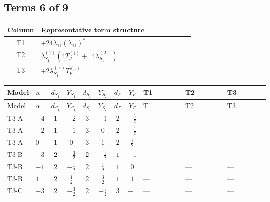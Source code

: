\documentclass[8pt]{article}
\begin{document}
\begin{landscape}
\subsection*{Terms 6 of 9}
\begin{center}
\begin{tabular}{@{}c >{\raggedright\arraybackslash}p{0.82\linewidth}@{}}
\toprule
Column & Representative term structure \\
\midrule
T1 & \(\displaystyle +24 {\lambda_{11}} \left({\lambda_{11}}\right)^{*}\) \\
\midrule
T2 & \(\displaystyle {\lambda_{S_1}^{(1)}} (4 T_{\nu}^{(1)}+14 {\lambda_{S_1}^{(A)}})\) \\
\midrule
T3 & \(\displaystyle +2 {\lambda_{S_1}^{(A)}} T_{\nu}^{(1)}\) \\
\midrule
\bottomrule
\end{tabular}
\end{center}
\smallskip
\tiny
\begin{longtable}{@{}llcccccc >{\raggedright\arraybackslash}p{0.21\linewidth} >{\raggedright\arraybackslash}p{0.21\linewidth} >{\raggedright\arraybackslash}p{0.21\linewidth}@{}}
\toprule
Model & $\alpha$ & $d_{S_1}$ & $Y_{S_1}$ & $d_{S_2}$ & $Y_{S_2}$ & $d_F$ & $Y_F$ & T1 & T2 & T3 \\
\midrule
\endfirsthead
\toprule
Model & $\alpha$ & $d_{S_1}$ & $Y_{S_1}$ & $d_{S_2}$ & $Y_{S_2}$ & $d_F$ & $Y_F$ & T1 & T2 & T3 \\
\midrule
\endhead
T3-A & $-4$ & $1$ & $-2$ & $3$ & $-1$ & $2$ & $-\frac{3}{2}$ & --- & --- & --- \\
\midrule
T3-A & $-2$ & $1$ & $-1$ & $3$ & $0$ & $2$ & $-\frac{1}{2}$ & --- & --- & --- \\
\midrule
T3-A & $0$ & $1$ & $0$ & $3$ & $1$ & $2$ & $\frac{1}{2}$ & --- & --- & --- \\
\midrule
T3-B & $-3$ & $2$ & $-\frac{3}{2}$ & $2$ & $-\frac{1}{2}$ & $1$ & $-1$ & --- & --- & --- \\
\midrule
T3-B & $-1$ & $2$ & $-\frac{1}{2}$ & $2$ & $\frac{1}{2}$ & $1$ & $0$ & \scriptsize\adjustbox{max width=\linewidth}{$\begin{gathered} +24 {\lambda_{11}} \left({\lambda_{11}}\right)^{*}\end{gathered}$} & --- & --- \\
\midrule
T3-B & $1$ & $2$ & $\frac{1}{2}$ & $2$ & $\frac{3}{2}$ & $1$ & $1$ & --- & --- & --- \\
\midrule
T3-C & $-3$ & $2$ & $-\frac{3}{2}$ & $2$ & $-\frac{1}{2}$ & $3$ & $-1$ & --- & --- & --- \\

\end{longtable}
\end{landscape}
\end{document}
